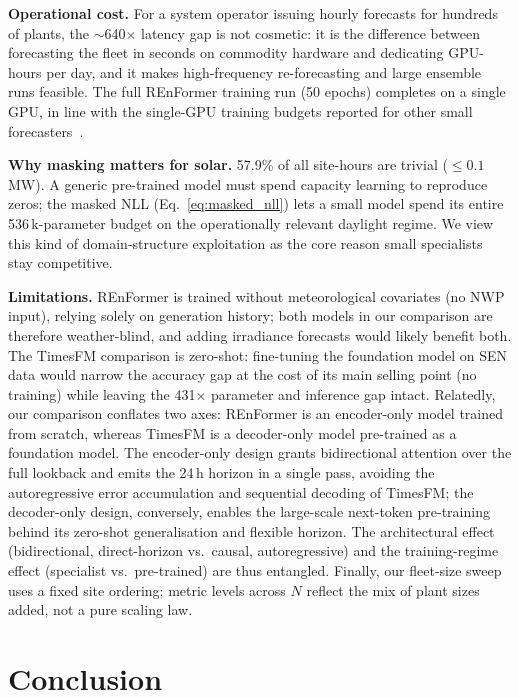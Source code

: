 \documentclass[10pt,twocolumn]{article}
\begin{document}
\textbf{Operational cost.}
For a system operator issuing hourly forecasts for hundreds of plants,
the $\sim$640$\times$ latency gap is not cosmetic: it is the difference
between forecasting the fleet in seconds on commodity hardware and
dedicating GPU-hours per day, and it makes high-frequency re-forecasting
and large ensemble runs feasible. The full REnFormer training run
(50 epochs) completes on a single GPU, in line with the single-GPU
training budgets reported for other small
forecasters~\cite{fan2025smetimes,birkel2025tinytsm}.

\textbf{Why masking matters for solar.}
57.9\% of all site-hours are trivial ($\leq 0.1$\,MW). A generic
pre-trained model must spend capacity learning to reproduce zeros;
the masked NLL (Eq.~\ref{eq:masked_nll}) lets a small model spend its
entire 536\,k-parameter budget on the operationally relevant daylight
regime. We view this kind of domain-structure exploitation as the core
reason small specialists stay competitive.

\textbf{Limitations.}
REnFormer is trained without meteorological covariates (no NWP input),
relying solely on generation history; both models in our comparison are
therefore weather-blind, and adding irradiance forecasts would likely
benefit both. The TimesFM comparison is zero-shot: fine-tuning the
foundation model on SEN data would narrow the accuracy gap at the cost
of its main selling point (no training) while leaving the
431$\times$ parameter and inference gap intact. Relatedly, our
comparison conflates two axes: REnFormer is an encoder-only model trained
from scratch, whereas TimesFM is a decoder-only model pre-trained as a
foundation model. The encoder-only design grants bidirectional attention
over the full lookback and emits the 24\,h horizon in a single pass,
avoiding the autoregressive error accumulation and sequential decoding of
TimesFM; the decoder-only design, conversely, enables the large-scale
next-token pre-training behind its zero-shot generalisation and flexible
horizon. The architectural effect (bidirectional, direct-horizon vs.\
causal, autoregressive) and the training-regime effect (specialist vs.\
pre-trained) are thus entangled. Finally, our fleet-size
sweep uses a fixed site ordering; metric levels across $N$ reflect the
mix of plant sizes added, not a pure scaling law.

\section{Conclusion}
\end{document}
